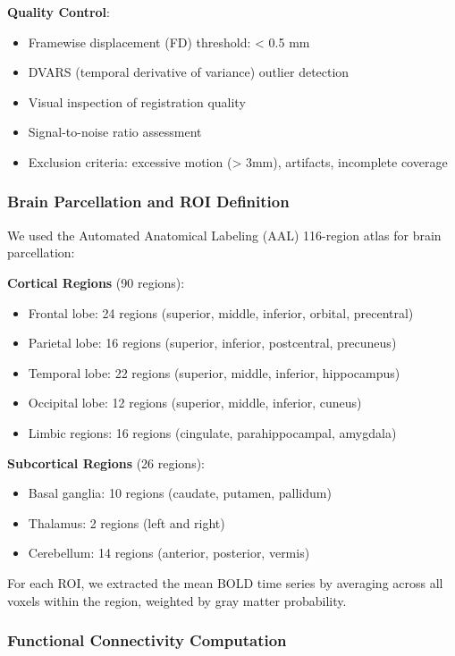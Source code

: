 \documentclass[10pt,journal,compsoc]{IEEEtran}
\begin{document}
\textbf{Quality Control}:
\begin{itemize}
\item Framewise displacement (FD) threshold: < 0.5 mm
\item DVARS (temporal derivative of variance) outlier detection
\item Visual inspection of registration quality
\item Signal-to-noise ratio assessment
\item Exclusion criteria: excessive motion (> 3mm), artifacts, incomplete coverage
\end{itemize}

\subsubsection{Brain Parcellation and ROI Definition}

We used the Automated Anatomical Labeling (AAL) 116-region atlas \cite{tzourio2002automated} for brain parcellation:

\textbf{Cortical Regions} (90 regions):
\begin{itemize}
\item Frontal lobe: 24 regions (superior, middle, inferior, orbital, precentral)
\item Parietal lobe: 16 regions (superior, inferior, postcentral, precuneus)
\item Temporal lobe: 22 regions (superior, middle, inferior, hippocampus)
\item Occipital lobe: 12 regions (superior, middle, inferior, cuneus)
\item Limbic regions: 16 regions (cingulate, parahippocampal, amygdala)
\end{itemize}

\textbf{Subcortical Regions} (26 regions):
\begin{itemize}
\item Basal ganglia: 10 regions (caudate, putamen, pallidum)
\item Thalamus: 2 regions (left and right)
\item Cerebellum: 14 regions (anterior, posterior, vermis)
\end{itemize}

For each ROI, we extracted the mean BOLD time series by averaging across all voxels within the region, weighted by gray matter probability.

\subsubsection{Functional Connectivity Computation}
\end{document}
